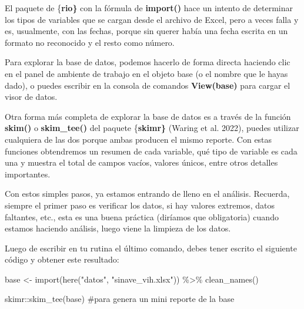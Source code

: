 \documentclass[
  letterpaper,
  DIV=11,
  numbers=noendperiod]{scrreprt}
\newenvironment{Shaded}{\begin{snugshade}}{\end{snugshade}}
\newcommand{\CommentTok}[1]{\textcolor[rgb]{0.37,0.37,0.37}{#1}}
\newcommand{\FunctionTok}[1]{\textcolor[rgb]{0.28,0.35,0.67}{#1}}
\newcommand{\NormalTok}[1]{\textcolor[rgb]{0.00,0.23,0.31}{#1}}
\newcommand{\OtherTok}[1]{\textcolor[rgb]{0.00,0.23,0.31}{#1}}
\newcommand{\SpecialCharTok}[1]{\textcolor[rgb]{0.37,0.37,0.37}{#1}}
\newcommand{\StringTok}[1]{\textcolor[rgb]{0.13,0.47,0.30}{#1}}
\begin{document}
El paquete de \{\textbf{rio\}} con la fórmula de \textbf{import()} hace
un intento de determinar los tipos de variables que se cargan desde el
archivo de Excel, pero a veces falla y es, usualmente, con las fechas,
porque sin querer había una fecha escrita en un formato no reconocido y
el resto como número.

Para explorar la base de datos, podemos hacerlo de forma directa
haciendo clic en el panel de ambiente de trabajo en el objeto base (o el
nombre que le hayas dado), o puedes escribir en la consola de comandos
\textbf{View(base)} para cargar el visor de datos.

Otra forma más completa de explorar la base de datos es a través de la
función \textbf{skim()} o \textbf{skim\_tee()} del paquete
\{\textbf{skimr\}} (Waring et al. 2022), puedes utilizar cualquiera de
las dos porque ambas producen el mismo reporte. Con estas funciones
obtendremos un resumen de cada variable, qué tipo de variable es cada
una y muestra el total de campos vacíos, valores únicos, entre otros
detalles importantes.

Con estos simples pasos, ya estamos entrando de lleno en el análisis.
Recuerda, siempre el primer paso es verificar los datos, si hay valores
extremos, datos faltantes, etc., esta es una buena práctica (diríamos
que obligatoria) cuando estamos haciendo análisis, luego viene la
limpieza de los datos.

Luego de escribir en tu rutina el último comando, debes tener escrito el
siguiente código y obtener este resultado:

\begin{Shaded}
\begin{Highlighting}[]
\NormalTok{base }\OtherTok{\textless{}{-}} \FunctionTok{import}\NormalTok{(}\FunctionTok{here}\NormalTok{(}\StringTok{"datos"}\NormalTok{, }\StringTok{"sinave\_vih.xlsx"}\NormalTok{)) }\SpecialCharTok{\%\textgreater{}\%} 
  \FunctionTok{clean\_names}\NormalTok{()}

\NormalTok{skimr}\SpecialCharTok{::}\FunctionTok{skim\_tee}\NormalTok{(base) }\CommentTok{\#para genera un mini reporte de la base}
\end{Highlighting}
\end{Shaded}
\end{document}
